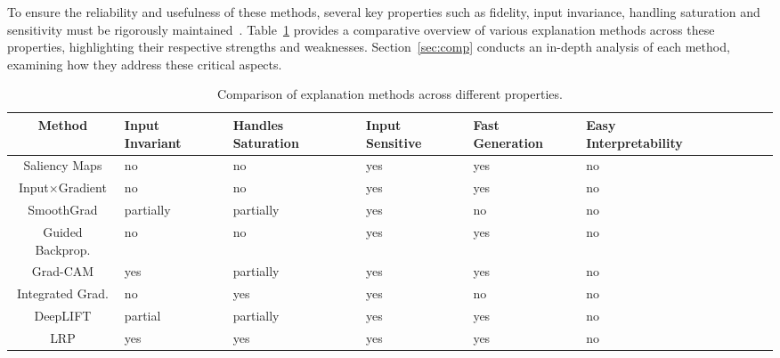 To ensure the reliability and usefulness of these methods, several key properties such as fidelity, input invariance, handling saturation and sensitivity must be rigorously maintained~\cite{NielsenDRRB22}. Table~\ref{tab:comparison} provides a comparative overview of various explanation methods across these properties, highlighting their respective strengths and weaknesses. Section~\ref{sec:comp} conducts an in-depth analysis of each method, examining how they address these critical aspects.
\newpage


\begin{table}[h!]
\small
\centering
\begin{tabularx}{\textwidth}{cXXXXXXXXX}
\hline
\textbf{Method} & \textbf{Input Invariant} & \textbf{Handles Saturation} & \textbf{Input Sensitive} & \textbf{Fast Generation} & \textbf{Easy Interpretability}\\
\hline
Saliency Maps & no & no & yes  & yes & no\\
Input$\times$Gradient & no & no & yes  & yes & no\\
SmoothGrad & partially & partially & yes  & no & no\\
Guided Backprop. & no & no & yes  & yes & no\\
Grad-CAM & yes & partially & yes & yes & no\\
Integrated Grad. & no & yes & yes  & no & no\\
DeepLIFT & partial & partially & yes  & yes & no\\
LRP & yes & yes & yes  & yes & no\\
\hline
\end{tabularx}
\caption{Comparison of explanation methods across different properties.}
\label{tab:comparison}
\end{table}


